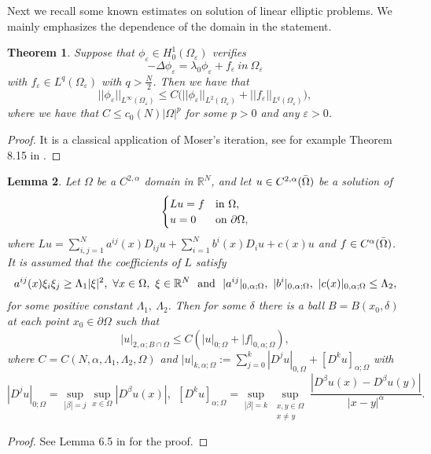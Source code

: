 \documentclass[11pt,reqno]{article}
\newtheorem{teo}{Theorem}[section]
\newtheorem{lemma}[teo]{Lemma}
\numberwithin{equation}{section}
\newcommand\R{\mathbb R}
\newcommand\e\varepsilon
\newcommand\la\lambda
\renewcommand\O\Omega
\newcommand\x\times
\newcommand{\Ma}{\color{blue}}
\begin{document}
Next we recall some known estimates on solution of linear elliptic problems. We mainly emphasizes the dependence of the domain in the statement.
	\begin{teo}\label{t1}
		Suppose that $\phi_\e\in H^1_0(\O_\e)$ verifies
		\begin{equation}
			-\Delta\phi_\e=\la_0\phi_\e+f_\e\ in\ \O_\e
		\end{equation}
		with $f_\e\in L^q(\O_\e)$ with $q>\frac N2$.
		Then we have that
		\begin{equation}\label{t2}
			||\phi_\e||_{L^\infty(\O_\e)}\le C \big(||\phi_\e||_{L^2(\O_\e)}+
			||f_\e||_{L^q(\O_\e)}\big),
		\end{equation}
		where we have that $C\le c_0(N)|\O|^p$  for some $p>0$ and any $\e>0$.
	\end{teo}
	\begin{proof}
		It is a classical application of Moser's iteration, see for example Theorem 8.15 in \cite{GT}.
		
        \end{proof}
\begin{lemma}\label{GTlem6.5}
    Let $\O$ be a $C^{2,\alpha}$ domain in $\R^N$, and let $u\in C^{2,\alpha}(\Bar{\O})$ be a solution of 
    \begin{equation*}
        \begin{cases}
          L u=f&\hbox{in}\  \O,\\
          u=0&\hbox{on}\    \partial\O,
        \end{cases}
    \end{equation*}
   where $Lu=\sum_{i,j=1}^N a^{ij}(x)D_{ij}u+\sum_{i=1}^N b^i(x)D_i u+c(x)u$ and  $f\in C^\alpha(\Bar{\O})$. It is assumed that  the coefficients of $L$ satisfy 
    $$
    a^{ij}(x)\xi_i\xi_j\ge \Lambda_1|\xi|^2,\ \forall x\in \O,\ \xi\in\R^N\ \ \hbox{and}\ \ 
    |a^{ij}|_{0,\alpha;\O},\ |b^i|_{0,\alpha;\O},\ |c(x)|_{0,\alpha;\O}\leq \Lambda_2,
    $$
    for some positive constant $\Lambda_1,\ \Lambda_2$.
    Then for some $\delta$ there is a ball $B=B(x_0,\delta)$ at each point $x_0\in \partial\O$ such that 
    \begin{equation}\label{eq0622-1}
        |u|_{2,\alpha;B\cap\O}\leq C(|u|_{0;\O}+|f|_{0,\alpha;\O}),
    \end{equation}
    where $C=C(N,\alpha,\Lambda_1,\Lambda_2,\O)$ and $|u|_{k,\alpha;\O}:=\sum_{j=0}^k|D^j u|_{0,\O}+[D^ku]_{\alpha;\O}$ with 
    $$|D^ju|_{0;\O}=\sup_{|\beta|=j}\sup_{x\in\O}|D^\beta u(x)|,\ \ [D^ku]_{\alpha;\O}=\sup_{|\beta|=k}\sup_{\substack{x,y\in\O\\x\neq y}}\frac{|D^\beta u(x)-D^\beta u(y)|}{|x-y|^\alpha}.$$
\end{lemma}
\begin{proof}
 See   Lemma 6.5 in \cite{GT} for the proof. 
\end{proof}
\end{document}
